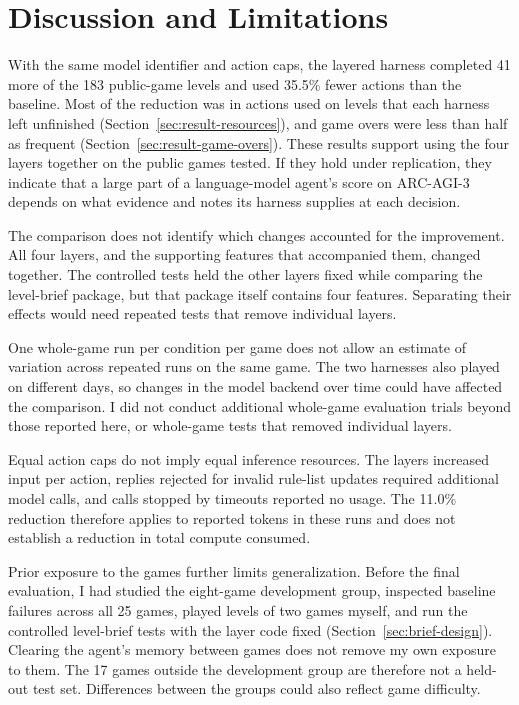\section{Discussion and Limitations}\label{sec:discussion}
With the same model identifier and action caps, the layered harness completed 41 more of the 183 public-game levels and used 35.5\% fewer actions than the baseline. Most of the reduction was in actions used on levels that each harness left unfinished (Section~\ref{sec:result-resources}), and game overs were less than half as frequent (Section~\ref{sec:result-game-overs}). These results support using the four layers together on the public games tested. If they hold under replication, they indicate that a large part of a language-model agent's score on ARC-AGI-3 depends on what evidence and notes its harness supplies at each decision.

The comparison does not identify which changes accounted for the improvement. All four layers, and the supporting features that accompanied them, changed together. The controlled tests held the other layers fixed while comparing the level-brief package, but that package itself contains four features. Separating their effects would need repeated tests that remove individual layers.

One whole-game run per condition per game does not allow an estimate of variation across repeated runs on the same game. The two harnesses also played on different days, so changes in the model backend over time could have affected the comparison. I did not conduct additional whole-game evaluation trials beyond those reported here, or whole-game tests that removed individual layers.

Equal action caps do not imply equal inference resources. The layers increased input per action, replies rejected for invalid rule-list updates required additional model calls, and calls stopped by timeouts reported no usage. The 11.0\% reduction therefore applies to reported tokens in these runs and does not establish a reduction in total compute consumed.

Prior exposure to the games further limits generalization. Before the final evaluation, I had studied the eight-game development group, inspected baseline failures across all 25 games, played levels of two games myself, and run the controlled level-brief tests with the layer code fixed (Section~\ref{sec:brief-design}). Clearing the agent's memory between games does not remove my own exposure to them. The 17 games outside the development group are therefore not a held-out test set. Differences between the groups could also reflect game difficulty.

